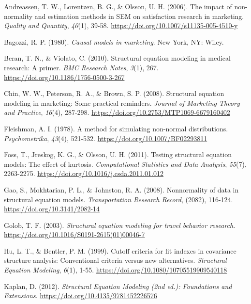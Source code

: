 \documentclass[
  english]{revcoles}
\newlength{\cslhangindent}
\newenvironment{cslreferences}%
  {\setlength{\parindent}{0pt}%
  \everypar{\setlength{\hangindent}{\cslhangindent}}\ignorespaces}%
  {\par}
\begin{document}
\hypertarget{refs}{}
\begin{cslreferences}
\leavevmode\hypertarget{ref-Andreassen2006}{}%
Andreassen, T. W., Lorentzen, B. G., \& Olsson, U. H. (2006). The impact
of non-normality and estimation methods in SEM on satisfaction research
in marketing. \emph{Quality and Quantity}, \emph{40}(1), 39-58.
\url{https://doi.org/10.1007/s11135-005-4510-y}

\leavevmode\hypertarget{ref-Bagozzi1980}{}%
Bagozzi, R. P. (1980). \emph{Causal models in marketing}. New York, NY:
Wiley.

\leavevmode\hypertarget{ref-Beran2010}{}%
Beran, T. N., \& Violato, C. (2010). Structural equation modeling in
medical research: A primer. \emph{BMC Research Notes}, \emph{3}(1), 267.
\url{https://doi.org/10.1186/1756-0500-3-267}

\leavevmode\hypertarget{ref-Chin2008}{}%
Chin, W. W., Peterson, R. A., \& Brown, S. P. (2008). Structural
equation modeling in marketing: Some practical reminders. \emph{Journal
of Marketing Theory and Practice}, \emph{16}(4), 287-298.
\url{https://doi.org/10.2753/MTP1069-6679160402}

\leavevmode\hypertarget{ref-Fleishman1978}{}%
Fleishman, A. I. (1978). A method for simulating non-normal
distributions. \emph{Psychometrika}, \emph{43}(4), 521-532.
\url{https://doi.org/10.1007/BF02293811}

\leavevmode\hypertarget{ref-Foss2011}{}%
Foss, T., Jreskog, K. G., \& Olsson, U. H. (2011). Testing structural
equation models: The effect of kurtosis. \emph{Computational Statistics
and Data Analysis}, \emph{55}(7), 2263-2275.
\url{https://doi.org/10.1016/j.csda.2011.01.012}

\leavevmode\hypertarget{ref-Gao2008}{}%
Gao, S., Mokhtarian, P. L., \& Johnston, R. A. (2008). Nonnormality of
data in structural equation models. \emph{Transportation Research
Record}, (2082), 116-124. \url{https://doi.org/10.3141/2082-14}

\leavevmode\hypertarget{ref-Golob2003}{}%
Golob, T. F. (2003). \emph{Structural equation modeling for travel
behavior research}. \url{https://doi.org/10.1016/S0191-2615(01)00046-7}

\leavevmode\hypertarget{ref-Hu1999}{}%
Hu, L. T., \& Bentler, P. M. (1999). Cutoff criteria for fit indexes in
covariance structure analysis: Conventional criteria versus new
alternatives. \emph{Structural Equation Modeling}, \emph{6}(1), 1-55.
\url{https://doi.org/10.1080/10705519909540118}

\leavevmode\hypertarget{ref-Kaplan2012}{}%
Kaplan, D. (2012). \emph{Structural Equation Modeling (2nd ed.):
Foundations and Extensions}. \url{https://doi.org/10.4135/9781452226576}


\end{cslreferences}
\end{document}
